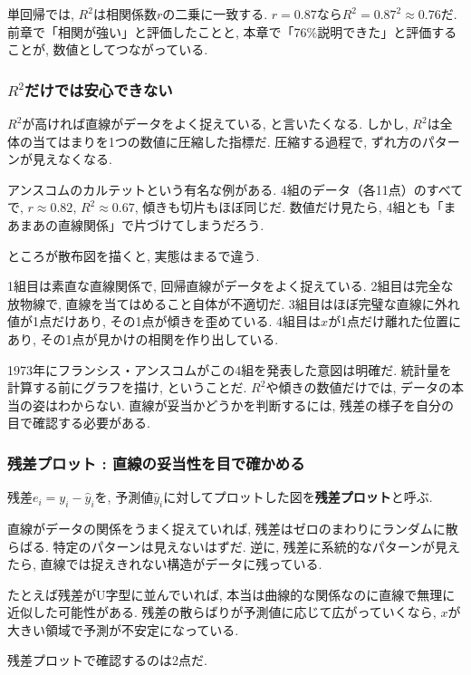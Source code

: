 単回帰では, $R^2$は相関係数$r$の二乗に一致する.
$r = 0.87$なら$R^2 = 0.87^2 \approx 0.76$だ.
前章で「相関が強い」と評価したことと, 本章で「76\%説明できた」と評価することが, 数値としてつながっている.

\subsubsection*{$R^2$だけでは安心できない}

$R^2$が高ければ直線がデータをよく捉えている, と言いたくなる.
しかし, $R^2$は全体の当てはまりを1つの数値に圧縮した指標だ.
圧縮する過程で, ずれ方のパターンが見えなくなる.

アンスコムのカルテットという有名な例がある.
4組のデータ（各11点）のすべてで, $r \approx 0.82$, $R^2 \approx 0.67$, 傾きも切片もほぼ同じだ.
数値だけ見たら, 4組とも「まあまあの直線関係」で片づけてしまうだろう.

ところが散布図を描くと, 実態はまるで違う.


1組目は素直な直線関係で, 回帰直線がデータをよく捉えている.
2組目は完全な放物線で, 直線を当てはめること自体が不適切だ.
3組目はほぼ完璧な直線に外れ値が1点だけあり, その1点が傾きを歪めている.
4組目は$x$が1点だけ離れた位置にあり, その1点が見かけの相関を作り出している.

1973年にフランシス・アンスコムがこの4組を発表した意図は明確だ.
統計量を計算する前にグラフを描け, ということだ.
$R^2$や傾きの数値だけでは, データの本当の姿はわからない.
直線が妥当かどうかを判断するには, 残差の様子を自分の目で確認する必要がある.

\subsubsection*{残差プロット : 直線の妥当性を目で確かめる}

残差$e_i = y_i - \hat{y}_i$を, 予測値$\hat{y}_i$に対してプロットした図を\textbf{残差プロット}と呼ぶ.

直線がデータの関係をうまく捉えていれば, 残差はゼロのまわりにランダムに散らばる.
特定のパターンは見えないはずだ.
逆に, 残差に系統的なパターンが見えたら, 直線では捉えきれない構造がデータに残っている.

たとえば残差がU字型に並んでいれば, 本当は曲線的な関係なのに直線で無理に近似した可能性がある.
残差の散らばりが予測値に応じて広がっていくなら, $x$が大きい領域で予測が不安定になっている.

残差プロットで確認するのは2点だ.

